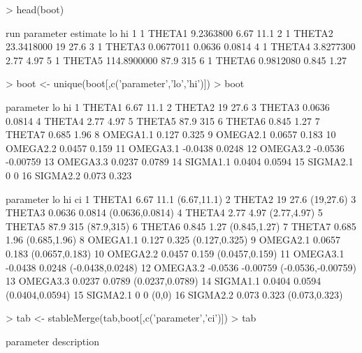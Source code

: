 \begin{Schunk}
\begin{Sinput}
> head(boot)
\end{Sinput}
\begin{Soutput}
  run parameter    estimate     lo     hi
1   1    THETA1   9.2363800   6.67   11.1
2   1    THETA2  23.3418000     19   27.6
3   1    THETA3   0.0677011 0.0636 0.0814
4   1    THETA4   3.8277300   2.77   4.97
5   1    THETA5 114.8900000   87.9    315
6   1    THETA6   0.9812080  0.845   1.27
\end{Soutput}
\begin{Sinput}
> boot <- unique(boot[,c('parameter','lo','hi')])
> boot
\end{Sinput}
\begin{Soutput}
   parameter      lo       hi
1     THETA1    6.67     11.1
2     THETA2      19     27.6
3     THETA3  0.0636   0.0814
4     THETA4    2.77     4.97
5     THETA5    87.9      315
6     THETA6   0.845     1.27
7     THETA7   0.685     1.96
8   OMEGA1.1   0.127    0.325
9   OMEGA2.1  0.0657    0.183
10  OMEGA2.2  0.0457    0.159
11  OMEGA3.1 -0.0438   0.0248
12  OMEGA3.2 -0.0536 -0.00759
13  OMEGA3.3  0.0237   0.0789
14  SIGMA1.1  0.0404   0.0594
15  SIGMA2.1       0        0
16  SIGMA2.2   0.073    0.323
\end{Soutput}
\begin{Soutput}
   parameter      lo       hi                 ci
1     THETA1    6.67     11.1        (6.67,11.1)
2     THETA2      19     27.6          (19,27.6)
3     THETA3  0.0636   0.0814    (0.0636,0.0814)
4     THETA4    2.77     4.97        (2.77,4.97)
5     THETA5    87.9      315         (87.9,315)
6     THETA6   0.845     1.27       (0.845,1.27)
7     THETA7   0.685     1.96       (0.685,1.96)
8   OMEGA1.1   0.127    0.325      (0.127,0.325)
9   OMEGA2.1  0.0657    0.183     (0.0657,0.183)
10  OMEGA2.2  0.0457    0.159     (0.0457,0.159)
11  OMEGA3.1 -0.0438   0.0248   (-0.0438,0.0248)
12  OMEGA3.2 -0.0536 -0.00759 (-0.0536,-0.00759)
13  OMEGA3.3  0.0237   0.0789    (0.0237,0.0789)
14  SIGMA1.1  0.0404   0.0594    (0.0404,0.0594)
15  SIGMA2.1       0        0              (0,0)
16  SIGMA2.2   0.073    0.323      (0.073,0.323)
\end{Soutput}
\begin{Sinput}
> tab <- stableMerge(tab,boot[,c('parameter','ci')])
> tab
\end{Sinput}
\begin{Soutput}
   parameter                                   description

\end{Soutput}
\end{Schunk}
